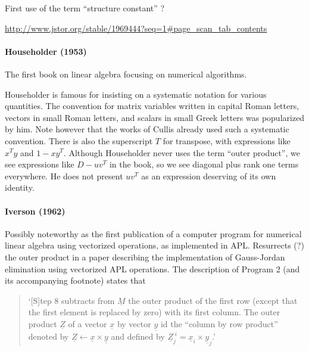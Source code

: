 First use of the term ``structure constant'' ?

\url{http://www.jstor.org/stable/1969444?seq=1#page_scan_tab_contents}



\paragraph{Householder (1953)~\cite{Householder1953}}

The first book on linear algebra focusing on numerical algorithms.

Householder is famous for insisting on a systematic notation for various quantities.
The convention for matrix variables written in capital Roman letters, vectors in small Roman letters, and scalars in small Greek letters was popularized by him. Note however that the works of Cullis already used such a systematic convention.
There is also the superscript $T$ for transpose, with expressions like $x^T y$ and $1 - x y^T$.
Although Householder never uses the term ``outer product'', we see expressions like $D - u v^T$ in the book, so we see diagonal plus rank one terms everywhere. He does not present $u v^T$ as an expression deserving of its own identity.



\paragraph{Iverson (1962)~\cite{Iverson1962}}

Possibly noteworthy as the first publication of a computer program for numerical linear algebra using vectorized operations, as implemented in APL.
Resurrects (?) the outer product in a paper describing the implementation of Gauss-Jordan elimination using vectorized APL operations. The description of Program 2 (and its accompanying footnote) states that

\begin{quote}
`[S]tep 8 subtracts from $\underline{\textit{M}}$ the outer product of the first row (except that the first element is replaced by zero) with its first column. The outer product $\underline{\textit{Z}}$ of a vector $\underline{\textit{x}}$ by vector $\underline{\textit{y}}$ id the ``column by row product'' denoted by $\underline{\textit{Z}} \leftarrow \underline{\textit{x}} \times \underline{\textit{y}}$ and defined by $\underline{\textit{Z}}^{\; i}_j = \underline{\textit{x}}_i \times \underline{\textit{y}}_j$.'
\end{quote}

